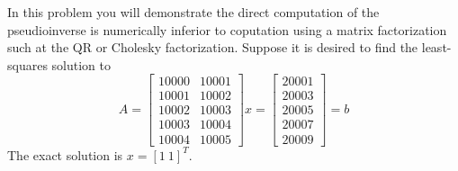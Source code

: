 \documentclass{homework}
\begin{document}
\begin{problem}[5-22]
  In this problem you will demonstrate the direct computation of the pseudioinverse is numerically inferior to coputation using a matrix factorization such at the QR or Cholesky factorization. Suppose it is desired to find the least-squares solution to 
  \[ A =
    \begin{bmatrix}
      10000 & 10001 \\
      10001 & 10002 \\
      10002 & 10003 \\
      10003 & 10004 \\
      10004 & 10005
    \end{bmatrix}
    x =
    \begin{bmatrix}
     20001 \\
     20003 \\
     20005 \\
     20007 \\
     20009
    \end{bmatrix} = b
  \]
  The exact solution is $x = [1\ 1]^T$.
\end{problem}
\end{document}
